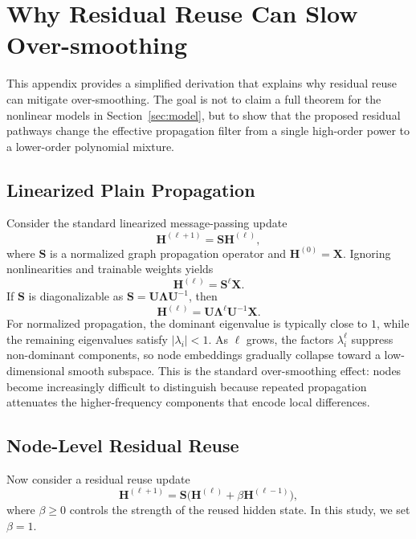 \section{Why Residual Reuse Can Slow Over-smoothing}
\label{app:oversmoothing}

This appendix provides a simplified derivation that explains why residual reuse can mitigate over-smoothing. The goal is not to claim a full theorem for the nonlinear models in Section~\ref{sec:model}, but to show that the proposed residual pathways change the effective propagation filter from a single high-order power to a lower-order polynomial mixture.

\subsection{Linearized Plain Propagation}

Consider the standard linearized message-passing update
\begin{equation}
\mathbf{H}^{(\ell+1)} = \mathbf{S}\mathbf{H}^{(\ell)},
\end{equation}
where $\mathbf{S}$ is a normalized graph propagation operator and $\mathbf{H}^{(0)}=\mathbf{X}$. Ignoring nonlinearities and trainable weights yields
\begin{equation}
\mathbf{H}^{(\ell)} = \mathbf{S}^{\ell}\mathbf{X}.
\end{equation}
If $\mathbf{S}$ is diagonalizable as $\mathbf{S}=\mathbf{U}\mathbf{\Lambda}\mathbf{U}^{-1}$, then
\begin{equation}
\mathbf{H}^{(\ell)} = \mathbf{U}\mathbf{\Lambda}^{\ell}\mathbf{U}^{-1}\mathbf{X}.
\end{equation}
For normalized propagation, the dominant eigenvalue is typically close to $1$, while the remaining eigenvalues satisfy $|\lambda_i|<1$. As $\ell$ grows, the factors $\lambda_i^{\ell}$ suppress non-dominant components, so node embeddings gradually collapse toward a low-dimensional smooth subspace. This is the standard over-smoothing effect: nodes become increasingly difficult to distinguish because repeated propagation attenuates the higher-frequency components that encode local differences.

\subsection{Node-Level Residual Reuse}

Now consider a residual reuse update
\begin{equation}
\mathbf{H}^{(\ell+1)} = \mathbf{S}\bigl(\mathbf{H}^{(\ell)} + \beta \mathbf{H}^{(\ell-1)}\bigr),
\label{eq:residual_reuse}
\end{equation}
where $\beta \ge 0$ controls the strength of the reused hidden state. In this study, we set $\beta=1$.

